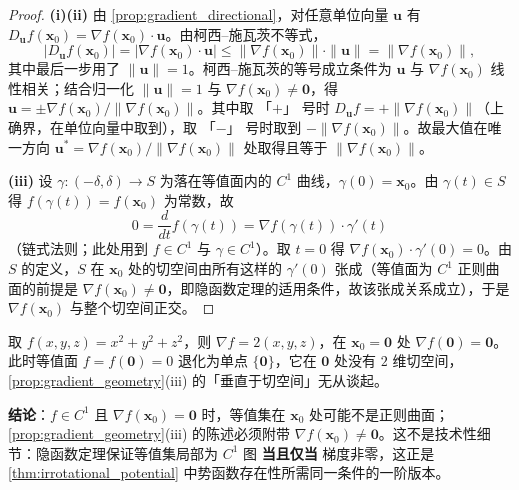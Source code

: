 \begin{proof}
\textbf{(i)(ii)} 由 \cref{prop:gradient_directional}，对任意单位向量 $\mathbf u$ 有 $D_{\mathbf u}f(\mathbf x_0) = \nabla f(\mathbf x_0)\cdot\mathbf u$。由柯西–施瓦茨不等式，
\[
|D_{\mathbf u}f(\mathbf x_0)| = |\nabla f(\mathbf x_0)\cdot\mathbf u| \le \|\nabla f(\mathbf x_0)\|\cdot\|\mathbf u\| = \|\nabla f(\mathbf x_0)\|,
\]
其中最后一步用了 $\|\mathbf u\|=1$。柯西–施瓦茨的等号成立条件为 $\mathbf u$ 与 $\nabla f(\mathbf x_0)$ 线性相关；结合归一化 $\|\mathbf u\|=1$ 与 $\nabla f(\mathbf x_0)\ne\mathbf 0$，得 $\mathbf u = \pm\nabla f(\mathbf x_0)/\|\nabla f(\mathbf x_0)\|$。其中取 「$+$」 号时 $D_{\mathbf u}f = +\|\nabla f(\mathbf x_0)\|$（上确界，在单位向量中取到），取 「$-$」 号时取到 $-\|\nabla f(\mathbf x_0)\|$。故最大值在唯一方向 $\mathbf u^\ast = \nabla f(\mathbf x_0)/\|\nabla f(\mathbf x_0)\|$ 处取得且等于 $\|\nabla f(\mathbf x_0)\|$。

\textbf{(iii)} 设 $\gamma:(-\delta,\delta)\to S$ 为落在等值面内的 $C^1$ 曲线，$\gamma(0)=\mathbf x_0$。由 $\gamma(t)\in S$ 得 $f(\gamma(t)) = f(\mathbf x_0)$ 为常数，故
\[
0 = \frac{d}{dt}f(\gamma(t)) = \nabla f(\gamma(t))\cdot\gamma'(t)
\]
（链式法则；此处用到 $f\in C^1$ 与 $\gamma\in C^1$）。取 $t=0$ 得 $\nabla f(\mathbf x_0)\cdot\gamma'(0)=0$。由 $S$ 的定义，$S$ 在 $\mathbf x_0$ 处的切空间由所有这样的 $\gamma'(0)$ 张成（等值面为 $C^1$ 正则曲面的前提是 $\nabla f(\mathbf x_0)\ne\mathbf 0$，即隐函数定理的适用条件，故该张成关系成立），于是 $\nabla f(\mathbf x_0)$ 与整个切空间正交。
\end{proof}

\begin{example}[梯度几何意义在临界点处退化]\label{ex:gradient_critical_point}
取 $f(x,y,z) = x^2+y^2+z^2$，则 $\nabla f = 2(x,y,z)$，在 $\mathbf x_0=\mathbf 0$ 处 $\nabla f(\mathbf 0)=\mathbf 0$。此时等值面 $f = f(\mathbf 0) = 0$ 退化为单点 $\{\mathbf 0\}$，它在 $\mathbf 0$ 处没有 $2$ 维切空间，\cref{prop:gradient_geometry}(iii) 的「垂直于切空间」无从谈起。

\textbf{结论}：$f\in C^1$ 且 $\nabla f(\mathbf x_0)=\mathbf 0$ 时，等值集在 $\mathbf x_0$ 处可能不是正则曲面；\cref{prop:gradient_geometry}(iii) 的陈述必须附带 $\nabla f(\mathbf x_0)\ne\mathbf 0$。这不是技术性细节：隐函数定理保证等值集局部为 $C^1$ 图 \textbf{当且仅当} 梯度非零，这正是 \cref{thm:irrotational_potential} 中势函数存在性所需同一条件的一阶版本。
\end{example}


